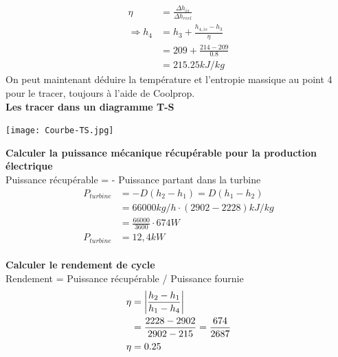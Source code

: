 \documentclass[12pt]{article}
\begin{document}
\begin{align*}
\eta &= \frac{\Delta h_{is}}{\Delta h_{reel}} \\
\Rightarrow h_4 &= h_3 + \frac{h_{4,is}-h_3}{\eta} \\
&= 209 + \frac{214-209}{0.8} \\
&= 215.25 kJ/kg
\end{align*}
On peut maintenant déduire la température et l'entropie massique au point 4 pour le tracer, toujours à l'aide de Coolprop.
\\

\textbf{Les tracer dans un diagramme T-S}

\begin{center}
  \texttt{[image: Courbe-TS.jpg]}
\end{center}


\textbf{Calculer la puissance mécanique récupérable pour la production électrique}
\\
Puissance récupérable = - Puissance partant dans la turbine
\begin{align*}
P_{turbine} &= - D(h_2-h_1) = D(h_1-h_2)\\
&= 66000kg/h\cdot(2902-2228)kJ/kg \\
&= \frac{66000}{3600} \cdot 674 W \\
P_{turbine} &= 12,4 kW
\end{align*}
\\

\textbf{Calculer le rendement de cycle}
\\
Rendement = Puissance récupérable / Puissance fournie
\begin{align*}
\eta &= \displaystyle\left\lvert\frac{h_2-h_1}{h_1-h_4}\displaystyle\right\rvert\\
&= \frac{2228-2902}{2902-215} = \frac{674}{2687} \\
\eta &= 0.25
\end{align*}
\end{document}
